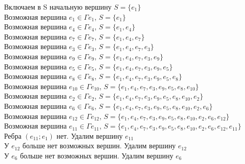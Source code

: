 \documentclass[a4paper,12pt]{article}
\begin{document}
    \pagebreak
    \noindent
    \begin{samepage}
        Включаем в S начальную вершину $S=\{e_1\}$\\
        \textquotedbl Возможная\textquotedbl{} вершина
        $e_{1}\in\Gamma e_{1}$, $S=\{e_{1}\}$\\
        \textquotedbl Возможная\textquotedbl{} вершина
        $e_{4}\in\Gamma e_{4}$, $S=\{e_{1},e_{4}\}$\\
        \textquotedbl Возможная\textquotedbl{} вершина
        $e_{7}\in\Gamma e_{7}$, $S=\{e_{1},e_{4},e_{7}\}$\\
        \textquotedbl Возможная\textquotedbl{} вершина
        $e_{3}\in\Gamma e_{3}$, $S=\{e_{1},e_{4},e_{7},e_{3}\}$\\
        \textquotedbl Возможная\textquotedbl{} вершина
        $e_{9}\in\Gamma e_{9}$, $S=\{e_{1},e_{4},e_{7},e_{3},e_{9}\}$\\
        \textquotedbl Возможная\textquotedbl{} вершина
        $e_{5}\in\Gamma e_{5}$, $S=\{e_{1},e_{4},e_{7},e_{3},e_{9},e_{5}\}$\\
        \textquotedbl Возможная\textquotedbl{} вершина
        $e_{8}\in\Gamma e_{8}$, $S=\{e_{1},e_{4},e_{7},e_{3},e_{9},e_{5},e_{8}\}$\\
        \textquotedbl Возможная\textquotedbl{} вершина
        $e_{10}\in\Gamma e_{10}$, $S=\{e_{1},e_{4},e_{7},e_{3},e_{9},e_{5},e_{8},e_{10}\}$\\
        \textquotedbl Возможная\textquotedbl{} вершина
        $e_{2}\in\Gamma e_{2}$, $S=\{e_{1},e_{4},e_{7},e_{3},e_{9},e_{5},e_{8},e_{10},e_{2}\}$\\
        \textquotedbl Возможная\textquotedbl{} вершина
        $e_{6}\in\Gamma e_{6}$, $S=\{e_{1},e_{4},e_{7},e_{3},e_{9},e_{5},e_{8},e_{10},e_{2},e_{6}\}$\\
        \textquotedbl Возможная\textquotedbl{} вершина
        $e_{12}\in\Gamma e_{12}$, $S=\{e_{1},e_{4},e_{7},e_{3},e_{9},e_{5},e_{8},e_{10},e_{2},e_{6},e_{12}\}$\\
        \textquotedbl Возможная\textquotedbl{} вершина
        $e_{11}\in\Gamma e_{11}$, $S=\{e_{1},e_{4},e_{7},e_{3},e_{9},e_{5},e_{8},e_{10},e_{2},e_{6},e_{12},e_{11}\}$\\
        Ребра $(e_{11};e_{1})$ нет. Удалим вершину $e_{11}$\\
        У $e_{12}$ больше нет \textquotedbl возможных\textquotedbl{} вершин. Удалим вершину $e_{12}$\\
        У $e_{6}$ больше нет \textquotedbl возможных\textquotedbl{} вершин. Удалим вершину $e_{6}$\\

\end{samepage}
\end{document}
